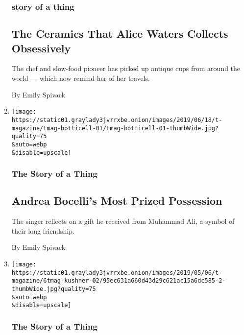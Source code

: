 \begin{enumerate}
  \hypertarget{story-of-a-thing}{%
  \subsubsection{story of a thing}\label{story-of-a-thing}}

  \hypertarget{the-ceramics-that-alice-waters-collects-obsessively}{%
  \subsection{The Ceramics That Alice Waters Collects
  Obsessively}\label{the-ceramics-that-alice-waters-collects-obsessively}}

  The chef and slow-food pioneer has picked up antique cups from around
  the world --- which now remind her of her travels.

  By Emily Spivack
\item
  \href{/2019/06/19/t-magazine/andrea-bocelli-muhammad-ali-boxing-gloves.html}{}

  \texttt{[image: https://static01.graylady3jvrrxbe.onion/images/2019/06/18/t-magazine/tmag-botticell-01/tmag-botticell-01-thumbWide.jpg?quality=75\\\&auto=webp\\\&disable=upscale]}

  \hypertarget{the-story-of-a-thing-4}{%
  \subsubsection{The Story of a Thing}\label{the-story-of-a-thing-4}}

  \hypertarget{andrea-bocellis-most-prized-possession}{%
  \subsection{Andrea Bocelli's Most Prized
  Possession}\label{andrea-bocellis-most-prized-possession}}

  The singer reflects on a gift he received from Muhammad Ali, a symbol
  of their long friendship.

  By Emily Spivack
\item
  \href{/2019/05/06/t-magazine/rachel-kushner-rattlesnake-belt.html}{}

  \texttt{[image: https://static01.graylady3jvrrxbe.onion/images/2019/05/06/t-magazine/6tmag-kushner-02/95ec631a660d43d29c621ac15a6dc585-2-thumbWide.jpg?quality=75\\\&auto=webp\\\&disable=upscale]}

  \hypertarget{the-story-of-a-thing-5}{%
  \subsubsection{The Story of a Thing}\label{the-story-of-a-thing-5}}


\end{enumerate}
